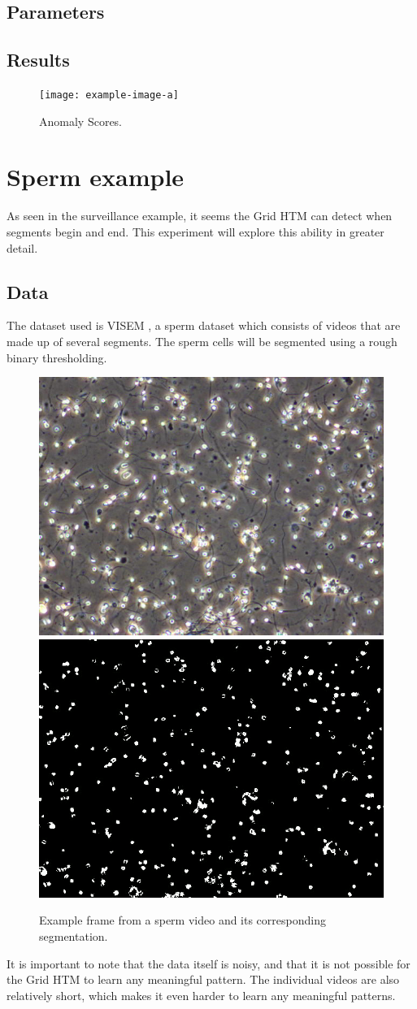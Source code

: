\subsection{Parameters}
\subsection{Results}
\begin{figure}[H]
    \centering
    \texttt{[image: example-image-a]}
    \caption{Anomaly Scores.}
\end{figure}

\section{Sperm example}
As seen in the surveillance example, it seems the Grid HTM can detect when segments begin and end. This experiment will explore this ability in greater detail.
\subsection{Data}
The dataset used is VISEM \cite{VISEM}, a sperm dataset which consists of videos that are made up of several segments. The sperm cells will be segmented using a rough binary thresholding.
\begin{figure}[H]
    \centering
    \includegraphics[width=.45\textwidth]{resources/experiments/sperm/sperm_example.png}
    \includegraphics[width=.45\textwidth]{resources/experiments/sperm/sperm_seg_example.png}
    \caption{Example frame from a sperm video and its corresponding segmentation.}
\end{figure}
It is important to note that the data itself is noisy, and that it is not possible for the Grid HTM to learn any meaningful pattern. The individual videos are also relatively short, which makes it even harder to learn any meaningful patterns.
